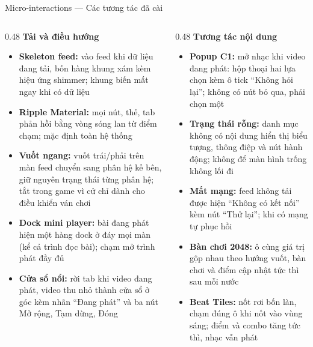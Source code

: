 \begin{frame}{Micro-interactions --- Các tương tác đã cài}
\begin{columns}[T]
\begin{column}{0.48\textwidth}
{\scriptsize\textbf{Tải và điều hướng}}\vspace{1mm}
{\tiny
\begin{itemize}\setlength{\itemsep}{2.5pt}
\item \textbf{Skeleton feed:} vào feed khi dữ liệu đang tải, bốn hàng khung xám kèm hiệu ứng shimmer; khung biến mất ngay khi có dữ liệu
\item \textbf{Ripple Material:} mọi nút, thẻ, tab phản hồi bằng vòng sóng lan từ điểm chạm; mặc định toàn hệ thống
\item \textbf{Vuốt ngang:} vuốt trái/phải trên màn feed chuyển sang phân hệ kế bên, giữ nguyên trạng thái từng phân hệ; tắt trong game vì cử chỉ dành cho điều khiển ván chơi
\item \textbf{Dock mini player:} bài đang phát hiện một hàng dock ở đáy mọi màn (kể cả trình đọc bài); chạm mở trình phát đầy đủ
\item \textbf{Cửa sổ nổi:} rời tab khi video đang phát, video thu nhỏ thành cửa sổ ở góc kèm nhãn ``Đang phát'' và ba nút Mở rộng, Tạm dừng, Đóng
\end{itemize}}
\end{column}
\begin{column}{0.48\textwidth}
{\scriptsize\textbf{Tương tác nội dung}}\vspace{1mm}
{\tiny
\begin{itemize}\setlength{\itemsep}{2.5pt}
\item \textbf{Popup C1:} mở nhạc khi video đang phát: hộp thoại hai lựa chọn kèm ô tick ``Không hỏi lại''; không có nút bỏ qua, phải chọn một
\item \textbf{Trạng thái rỗng:} danh mục không có nội dung hiển thị biểu tượng, thông điệp và nút hành động; không để màn hình trống không lối đi
\item \textbf{Mất mạng:} feed không tải được hiện ``Không có kết nối'' kèm nút ``Thử lại''; khi có mạng tự phục hồi
\item \textbf{Bàn chơi 2048:} ô cùng giá trị gộp nhau theo hướng vuốt, bàn chơi và điểm cập nhật tức thì sau mỗi nước
\item \textbf{Beat Tiles:} nốt rơi bốn làn, chạm đúng ô khi nốt vào vùng sáng; điểm và combo tăng tức thì, nhạc vẫn phát
\end{itemize}}
\end{column}
\end{columns}
\end{frame}
